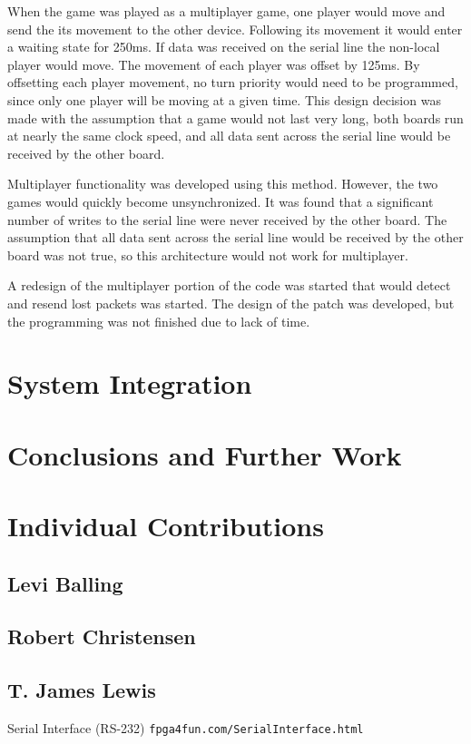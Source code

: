 \documentclass{article}
\begin{document}
When the game was played as a multiplayer game, one player would move and send the its movement to the other device.  Following its movement it would enter a waiting state for 250ms.  If data was received on the serial line the non-local player would move.  The movement of each player was offset by 125ms.  By offsetting each player movement, no turn priority would need to be programmed, since only one player will be moving at a given time.  This design decision was made with the assumption that a game would not last very long, both boards run at nearly the same clock speed, and all data sent across the serial line would be received by the other board.

Multiplayer functionality was developed using this method.  However, the two games would quickly become unsynchronized.  It was found that a significant number of writes to the serial line were never received by the other board.  The assumption that all data sent across the serial line would be received by the other board was not true, so this architecture would not work for multiplayer.

A redesign of the multiplayer portion of the code was started that would detect and resend lost packets was started.  The design of the patch was developed, but the programming was not finished due to lack of time.

\section{System Integration}

\section{Conclusions and Further Work}

\section{Individual Contributions}

\subsection{Levi Balling}

\subsection{Robert Christensen}

\subsection{T. James Lewis}

\begin{thebibliography}{99}

 Serial Interface (RS-232) \texttt{fpga4fun.com/SerialInterface.html}

\end{thebibliography}
\end{document}
